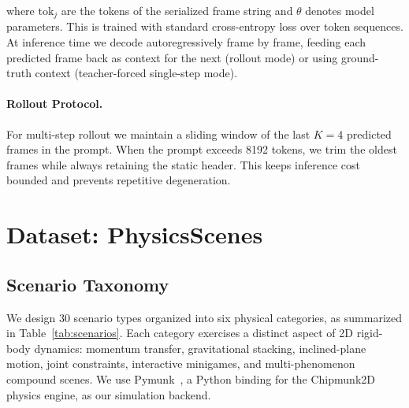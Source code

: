 \documentclass{article}
\begin{document}
where $\text{tok}_j$ are the tokens of the serialized frame string and $\theta$
denotes model parameters. This is trained with standard cross-entropy loss over
token sequences. At inference time we decode autoregressively frame by frame,
feeding each predicted frame back as context for the next (rollout mode) or using
ground-truth context (teacher-forced single-step mode).

\paragraph{Rollout Protocol.}
For multi-step rollout we maintain a sliding window of the last $K=4$ predicted
frames in the prompt. When the prompt exceeds 8192 tokens, we trim the oldest
frames while always retaining the static header. This keeps inference cost bounded
and prevents repetitive degeneration.

\section{Dataset: PhysicsScenes}
\label{sec:dataset}

\subsection{Scenario Taxonomy}

We design 30 scenario types organized into six physical categories, as summarized
in Table~\ref{tab:scenarios}. Each category exercises a distinct aspect of 2D
rigid-body dynamics: momentum transfer, gravitational stacking, inclined-plane
motion, joint constraints, interactive minigames, and multi-phenomenon compound
scenes. We use Pymunk~\citep{pymunk2024}, a Python binding for the Chipmunk2D
physics engine, as our simulation backend.
\end{document}
